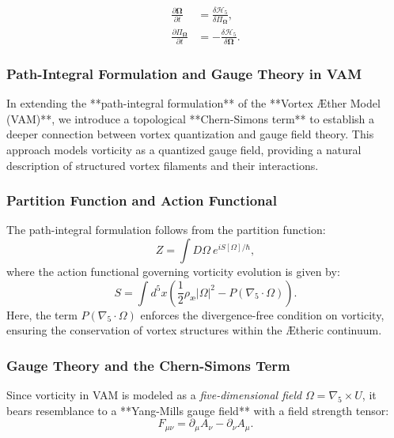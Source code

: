\begin{align}
    \frac{\partial \boldsymbol{\Omega}}{\partial t} &= \frac{\delta \mathcal{H}_5}{\delta \Pi_{\boldsymbol{\Omega}}}, \\
    \frac{\partial \Pi_{\boldsymbol{\Omega}}}{\partial t} &= -\frac{\delta \mathcal{H}_5}{\delta \boldsymbol{\Omega}}.
\end{align}

\subsubsection*{Path-Integral Formulation and Gauge Theory in VAM}

In extending the **path-integral formulation** of the **Vortex \AE ther Model (VAM)**, we introduce a topological **Chern-Simons term** to establish a deeper connection between vortex quantization and gauge field theory. This approach models vorticity as a quantized gauge field, providing a natural description of structured vortex filaments and their interactions.

\subsubsection*{Partition Function and Action Functional}

The path-integral formulation follows from the partition function:
\begin{equation}
    Z = \int D\Omega \ e^{iS[\Omega]/\hbar},
\end{equation}
where the action functional governing vorticity evolution is given by:
\begin{equation}
    S = \int d^5x \left( \frac{1}{2} \rho_{\text{\ae}} |\Omega|^2 - P (\nabla_5 \cdot \Omega) \right).
\end{equation}
Here, the term \( P (\nabla_5 \cdot \Omega) \) enforces the divergence-free condition on vorticity, ensuring the conservation of vortex structures within the \AE theric continuum.

\subsubsection*{Gauge Theory and the Chern-Simons Term}

Since vorticity in VAM is modeled as a \emph{five-dimensional field} \( \Omega = \nabla_5 \times U \), it bears resemblance to a **Yang-Mills gauge field** with a field strength tensor:
\begin{equation}
    F_{\mu\nu} = \partial_{\mu} A_{\nu} - \partial_{\nu} A_{\mu}.
\end{equation}

